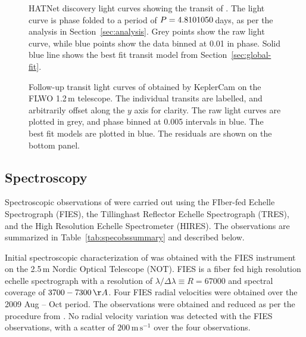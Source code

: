 \documentclass[apjl]{emulateapj}
\begin{document}
\begin{figure}[!ht]
\caption{
HATNet discovery light curves showing the transit of \hatcurb{}. The light curve is phase folded to a period of $P = 4.8101050$\,days, as per the analysis in Section~\ref{sec:analysis}. Grey points show the raw light curve, while blue points show the data binned at 0.01 in phase. Solid blue line shows the best fit transit model from Section~\ref{sec:global-fit}. 
\label{fig:hat_discovery}}
\end{figure}


\begin{figure}[!ht]

\caption{
    Follow-up transit light curves of \hatcurb{} obtained by KeplerCam on the FLWO 1.2\,m telescope. The individual transits are labelled, and arbitrarily offset along the $y$ axis for clarity. The raw light curves are plotted in grey, and phase binned at 0.005 intervals in blue. The best fit models are plotted in blue. The residuals are shown on the bottom panel. 
\label{fig:fulc}} \end{figure}


\subsection{Spectroscopy}
\label{sec:spec}
\begin{comment}
\end{comment}

Spectroscopic observations of \hatcur{} were carried out using the FIber-fed Echelle Spectrograph (FIES), the Tillinghast Reflector Echelle Spectrograph (TRES), and the High Resolution Echelle Spectrometer (HIRES). The observations are summarized in Table~\ref{tab:specobssummary} and described below.

Initial spectroscopic characterization of \hatcurb{} was obtained with the FIES instrument \citep{2014AN....335...41T} on the 2.5\,m Nordic Optical Telescope (NOT). FIES is a fiber fed high resolution echelle spectrograph with a resolution of $ \lambda/\Delta \lambda \equiv R = 67000$ and spectral coverage of $3700-7300\,\AA$. Four FIES radial velocities were obtained over the 2009 Aug -- Oct period. The observations were obtained and reduced as per the procedure from \citet{Buchave:2010}. No radial velocity variation was detected with the FIES observations, with a scatter of $200\,\mathrm{m\,s}^{-1}$ over the four observations.
\end{document}

